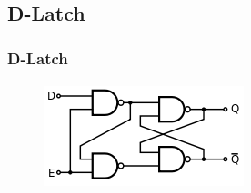 \subsection{D-Latch} %
\label{sub:D-Latch}
\begin{frame}
    \frametitle{D-Latch}
    \framesubtitle{}
    \begin{figure}[H]
    \begin{center}
            \includegraphics[scale=0.6]{./img/schaltung/D-Latch.png}
    \end{center}
    \end{figure}
\end{frame}
